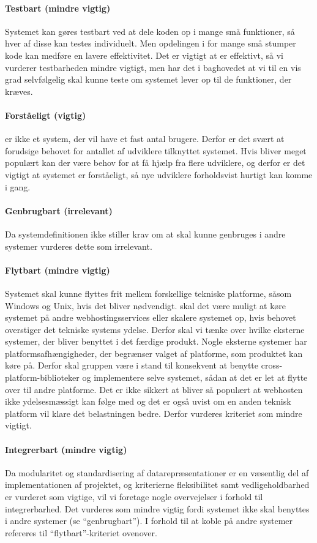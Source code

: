 \paragraph{Testbart (mindre vigtig)} 
Systemet kan gøres testbart ved at dele koden op i mange små funktioner, så hver af disse kan testes individuelt. Men opdelingen i for mange små stumper kode kan medføre en lavere effektivitet. Det er vigtigt at \Foodl{} er effektivt, så vi vurderer testbarheden mindre vigtigt, men har det i baghovedet at vi til en vis grad selvfølgelig skal kunne teste om systemet lever op til de funktioner, der kræves.

\paragraph{Forståeligt (vigtig)} 
\Foodl{} er ikke et system, der vil have et fast antal brugere. Derfor er det svært at forudsige behovet for antallet af udviklere tilknyttet systemet. Hvis \Foodl{} bliver meget populært kan der være behov for at få hjælp fra flere udviklere, og derfor er det vigtigt at systemet er forståeligt, så nye udviklere forholdsvist hurtigt kan komme i gang.

\paragraph{Genbrugbart (irrelevant)} 
Da systemdefinitionen ikke stiller krav om at \Foodl{} skal kunne genbruges i andre systemer vurderes dette som irrelevant.

\paragraph{Flytbart (mindre vigtig)} 
Systemet skal kunne flyttes frit mellem forskellige tekniske platforme, såsom Windows og Unix, hvis det bliver nødvendigt. \Fx skal det være muligt at køre systemet på andre webhostingsservices eller skalere systemet op, hvis behovet overstiger det tekniske systems ydelse. Derfor skal vi tænke over hvilke eksterne systemer, der bliver benyttet i det færdige produkt. Nogle eksterne systemer har platformsafhængigheder, der begrænser valget af platforme, som produktet kan køre på. Derfor skal gruppen være i stand til konsekvent at benytte cross-platform-biblioteker og implementere selve systemet, sådan at det er let at flytte over til andre platforme. Det er ikke sikkert at \Foodl{} bliver så populært at webhosten ikke ydelsesmæssigt kan følge med og det er også uvist om en anden teknisk platform vil klare det belastningen bedre. Derfor vurderes kriteriet som mindre vigtigt.

\paragraph{Integrerbart (mindre vigtig)} 
Da modularitet og standardisering af datarepræsentationer er en væsentlig del af implementationen af projektet, og kriterierne fleksibilitet samt vedligeholdbarhed er vurderet som vigtige, vil vi foretage nogle overvejelser i forhold til integrerbarhed. Det vurderes som mindre vigtig fordi systemet ikke skal benyttes i andre systemer (se ``genbrugbart''). I forhold til at koble på andre systemer refereres til ``flytbart''-kriteriet ovenover.
